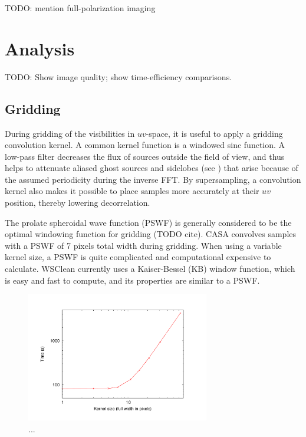 \documentclass[useAMS,usenatbib]{mn2e}
\begin{document}
TODO: mention full-polarization imaging

\section{Analysis} \label{sec:analysis}
TODO: Show image quality; show time-efficiency comparisons.

\subsection{Gridding} \label{sec:gridding}
During gridding of the visibilities in $uv$-space, it is useful to apply a gridding convolution kernel. A common kernel function is a windowed sinc function. A low-pass filter decreases the flux of sources outside the field of view, and thus helps to attenuate aliased ghost sources and sidelobes (see \citealt{post-correlation-filtering}) that arise because of the assumed periodicity during the inverse FFT. By supersampling, a convolution kernel also makes it possible to place samples more accurately at their $uv$ position, thereby lowering decorrelation.

The prolate spheroidal wave function (PSWF) is generally considered to be the optimal windowing function for gridding (TODO cite). CASA convolves samples with a PSWF of 7 pixels total width during gridding. When using a variable kernel size, a PSWF is quite complicated and computational expensive to calculate. WSClean currently uses a Kaiser-Bessel (KB) window function, which is easy and fast to compute, and its properties are similar to a PSWF.

\begin{figure}
\begin{center}
\includegraphics[width=8cm]{img/benchmark-kernelsize/kernel}
\caption{...}
\label{fig:timing-kernelsize}
\end{center}
\end{figure}
\end{document}
